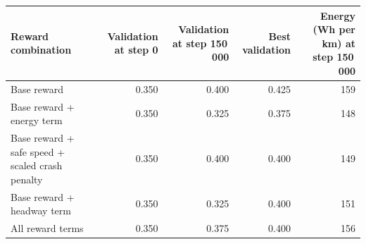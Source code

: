 \begin{tabular}{@{}lrrrr@{}}\toprule
Reward combination & Validation at step 0 & Validation at step 150\,000 & Best validation & Energy (Wh per km) at step 150\,000\\\midrule
Base reward & 0.350 & 0.400 & 0.425 & 159\\
Base reward + energy term & 0.350 & 0.325 & 0.375 & 148\\
Base reward + safe speed + scaled crash penalty & 0.350 & 0.400 & 0.400 & 149\\
Base reward + headway term & 0.350 & 0.325 & 0.400 & 151\\
All reward terms & 0.350 & 0.375 & 0.400 & 156\\
\bottomrule\end{tabular}
